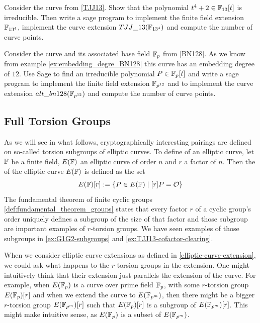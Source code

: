 \begin{exercise}
\label{exercise:TJJ134}
 Consider the  curve from \examplename{} \ref{TJJ13}. Show that the polynomial $t^4+2\in \mathbb{F}_{13}[t]$ is irreducible. Then write a sage program to implement the finite field extension $\mathbb{F}_{13^4}$, implement the curve extension $TJJ\_13(\mathbb{F}_{13^4})$ and compute the number of curve points.
\end{exercise}
\begin{exercise}
\label{exercise:BN128-extension}
Consider the  curve and its associated base field $\mathbb{F}_p$ from \examplename{} \ref{BN128}. As we know from example \ref{ex:embedding_degre_BN128} this curve has an embedding degree of $12$. Use Sage to find an irreducible polynomial $P\in \mathbb{F}_p[t]$ and write a sage program to implement the finite field extension $\mathbb{F}_{p^{12}}$ and to implement the curve extension $alt\_bn128(\mathbb{F}_{p^{12}})$ and compute the number of curve points.
\end{exercise}
\subsection{Full Torsion Groups}
\label{sec:full-torsion} As we will see in what follows, cryptographically interesting pairings are defined on so-called torsion subgroups of elliptic curves. To define  of an elliptic curve, let $\mathbb{F}$ be a finite field, $E(\mathbb{F})$ an elliptic curve of order $n$ and $r$ a factor of $n$. Then the  of the elliptic curve $E(\mathbb{F})$ is defined as the set
\begin{equation}
\label{def:torsion_group}
E(\mathbb{F})[r]:= \{P\in E(\mathbb{F})\;|\; [r]P = \mathcal{O}\}
\end{equation} 
The fundamental theorem of finite cyclic groups \ref{def:fundamental_theorem_groups} states that every factor $r$ of a cyclic group's order uniquely defines a subgroup of the size of that factor and those subgroup are important examples of $r$-torsion groups. We have seen examples of those subgroups in \ref{ex:G1G2-subgroups} and \ref{ex:TJJ13-cofactor-clearing}.

When we consider elliptic curve extensions as defined in \ref{elliptic-curve-extension}, we could ask what happens to the $r$-torsion groups in the extension. One might intuitively think that their extension just parallels the extension of the curve. For example, when $E(\mathbb{F}_p)$ is a curve over prime field $\mathbb{F}_p$, with some $r$-torsion group $E(\mathbb{F}_p)[r]$ and when we extend the curve to $E(\mathbb{F}_{p^m})$, then there might be a bigger $r$-torsion group $E(\mathbb{F}_{p^m})[r]$ such that $E(\mathbb{F}_p)[r]$ is a subgroup of $E(\mathbb{F}_{p^m})[r]$. This might make intuitive sense, as $E(\mathbb{F}_p)$ is a subset of $E(\mathbb{F}_{p^m})$. 

